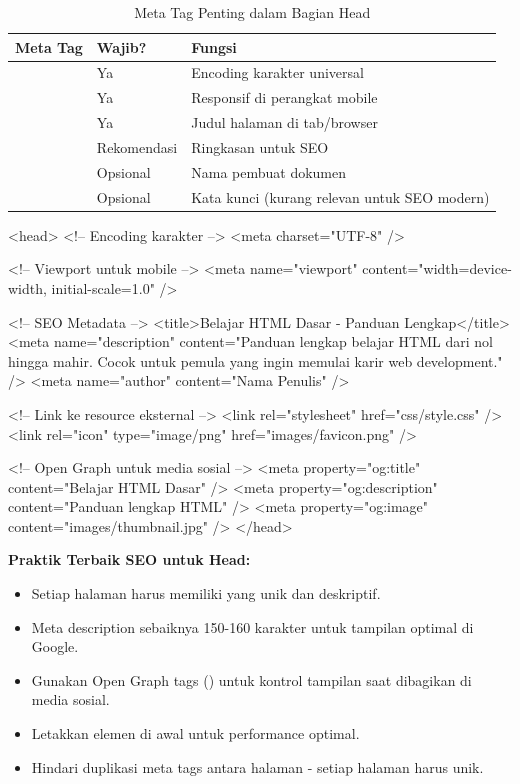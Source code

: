 \begin{table}[H]
\centering
\begin{tabular}{|P{4cm}|P{2.5cm}|P{5cm}|}
\hline
\textbf{Meta Tag} & \textbf{Wajib?} & \textbf{Fungsi} \\
\hline
{} & Ya & Encoding karakter universal \\
\hline
{} & Ya & Responsif di perangkat mobile \\
\hline
{} & Ya & Judul halaman di tab/browser \\
\hline
{} & Rekomendasi & Ringkasan untuk SEO \\
\hline
{} & Opsional & Nama pembuat dokumen \\
\hline
{} & Opsional & Kata kunci (kurang relevan untuk SEO modern) \\
\hline
\end{tabular}
\caption{Meta Tag Penting dalam Bagian Head}
\label{tab:meta-tags}
\end{table}

\begin{webcode}[language=HTML, caption={Contoh Bagian Head yang Lengkap}]
<head>
  <!-- Encoding karakter -->
  <meta charset="UTF-8" />
  
  <!-- Viewport untuk mobile -->
  <meta name="viewport" 
        content="width=device-width, initial-scale=1.0" />
  
  <!-- SEO Metadata -->
  <title>Belajar HTML Dasar - Panduan Lengkap</title>
  <meta name="description" 
        content="Panduan lengkap belajar HTML dari nol hingga mahir. 
                 Cocok untuk pemula yang ingin memulai karir web development." />
  <meta name="author" content="Nama Penulis" />
  
  <!-- Link ke resource eksternal -->
  <link rel="stylesheet" href="css/style.css" />
  <link rel="icon" type="image/png" href="images/favicon.png" />
  
  <!-- Open Graph untuk media sosial -->
  <meta property="og:title" content="Belajar HTML Dasar" />
  <meta property="og:description" content="Panduan lengkap HTML" />
  <meta property="og:image" content="images/thumbnail.jpg" />
</head>
\end{webcode}

\begin{catatan}
\textbf{Praktik Terbaik SEO untuk Head:}
\begin{itemize}[leftmargin=*]
  \item Setiap halaman harus memiliki  yang unik dan deskriptif.
  \item Meta description sebaiknya 150-160 karakter untuk tampilan optimal di Google.
  \item Gunakan Open Graph tags () untuk kontrol tampilan saat dibagikan di media sosial.
  \item Letakkan elemen  di awal  untuk performance optimal.
  \item Hindari duplikasi meta tags antara halaman - setiap halaman harus unik.
\end{itemize}
\end{catatan}

